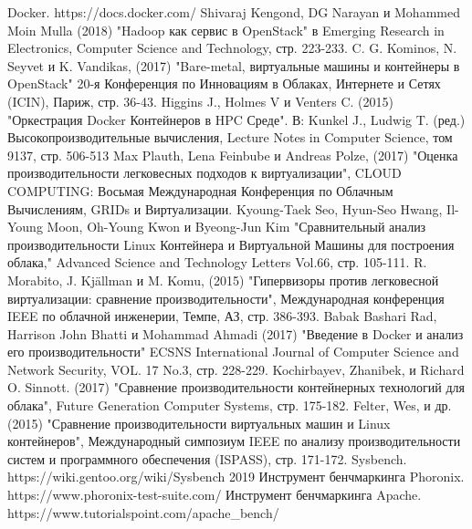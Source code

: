 \documentclass{mirea}
\begin{document}
	\begin{thebibliography}{99\kern\bibindent}
		 Docker. https://docs.docker.com/
		 Shivaraj Kengond, DG Narayan и Mohammed Moin Mulla (2018) "Hadoop как сервис в OpenStack" в Emerging Research in Electronics, Computer Science and Technology, стр. 223-233.
		 C. G. Kominos, N. Seyvet и K. Vandikas, (2017) "Bare-metal, виртуальные машины и контейнеры в OpenStack" 20-я Конференция по Инновациям в Облаках, Интернете и Сетях (ICIN), Париж, стр. 36-43.
		 Higgins J., Holmes V и Venters C. (2015) "Оркестрация Docker Контейнеров в HPC Среде". В: Kunkel J., Ludwig T. (ред.) Высокопроизводительные вычисления, Lecture Notes in Computer Science, том 9137, стр. 506-513
		 Max Plauth, Lena Feinbube и Andreas Polze, (2017) "Оценка производительности легковесных подходов к виртуализации", CLOUD COMPUTING: Восьмая Международная Конференция по Облачным Вычислениям, GRIDs и Виртуализации.
		 Kyoung-Taek Seo, Hyun-Seo Hwang, Il-Young Moon, Oh-Young Kwon и Byeong-Jun Kim "Сравнительный анализ производительности Linux Контейнера и Виртуальной Машины для построения облака," Advanced Science and Technology Letters Vol.66, стр. 105-111.
		 R. Morabito, J. Kjällman и M. Komu, (2015) "Гипервизоры против легковесной виртуализации: сравнение производительности", Международная конференция IEEE по облачной инженерии, Темпе, АЗ, стр. 386-393.
		 Babak Bashari Rad, Harrison John Bhatti и Mohammad Ahmadi (2017) "Введение в Docker и анализ его производительности" ECSNS International Journal of Computer Science and Network Security, VOL. 17 No.3, стр. 228-229.
		 Kochirbayev, Zhanibek, и Richard O. Sinnott. (2017) "Сравнение производительности контейнерных технологий для облака", Future Generation Computer Systems, стр. 175-182.
		 Felter, Wes, и др. (2015) "Сравнение производительности виртуальных машин и Linux контейнеров", Международный симпозиум IEEE по анализу производительности систем и программного обеспечения (ISPASS), стр. 171-172.
		 Sysbench. https://wiki.gentoo.org/wiki/Sysbench 2019
		 Инструмент бенчмаркинга Phoronix. https://www.phoronix-test-suite.com/
		 Инструмент бенчмаркинга Apache. https://www.tutorialspoint.com/apache\_bench/
	\end{thebibliography}

	
	
	
	
	
	
	
\end{document}

